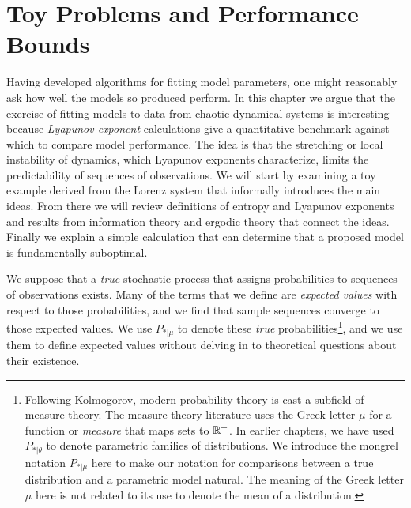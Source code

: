 

\chapter{Toy Problems and Performance Bounds}
\label{chap:toys}

Having developed algorithms for fitting model parameters, one might
reasonably ask how well the models so produced perform.  In this
chapter we argue that the exercise of fitting models to data from
chaotic dynamical systems is interesting because \emph{Lyapunov
  exponent} calculations give a quantitative benchmark against which
to compare model performance.  The idea is that the stretching or
local instability of dynamics, which Lyapunov exponents characterize,
limits the predictability  of sequences of
observations.  We will start by examining a toy example derived from
the Lorenz system that informally introduces the main ideas.  From
there we will review definitions of entropy and Lyapunov exponents and
results from information theory and ergodic theory that connect the
ideas.  Finally we explain a simple calculation that can determine
that a proposed model is fundamentally suboptimal.

We suppose that a \emph{true} stochastic process that assigns
probabilities to sequences of observations exists.  Many of the terms
that we define are \emph{expected values} with respect to those
probabilities, and we find that sample sequences converge to those
expected values.  We use $P_{*|\mu}$ to denote these \emph{true}
probabilities\footnote{Following Kolmogorov, modern probability theory
  is cast a subfield of measure theory.  The measure theory literature
  uses the Greek letter $\mu$ for a function or \emph{measure} that
  maps sets to $\mathbb{R}^+$.  In earlier chapters, we have used
  $P_{*|\theta}$ to denote parametric families of distributions.  We
  introduce the mongrel notation $P_{*|\mu}$ here to make our notation
  for comparisons between a true distribution and a parametric model
  natural.  The meaning of the Greek letter $\mu$ here is not related
  to its use to denote the mean of a distribution.}, and we use them
to define expected values without delving in to theoretical questions
about their existence.

